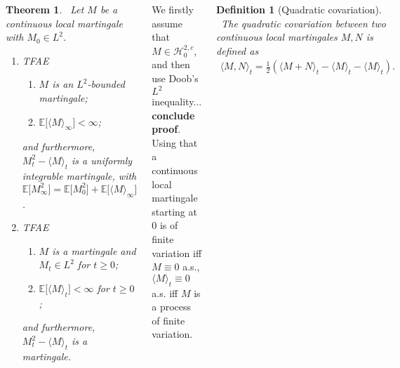 \documentclass{tikzposter} %
\newtheorem{theorem}{Theorem}
\newtheorem{definition}{Definition}
\begin{document}
\begin{columns}
{    \begin{theorem}
    \ Let $M$ be a continuous local martingale with $M_{0} \in L^{2}$.
    \begin{enumerate}[label=\roman*.]
            \item TFAE
            \begin{enumerate}[label=(\alph*)]
                    \item $M$ is an $L^{2}$-bounded martingale;
                    \item $\mathbb{E}\big[\langle M \rangle_{\infty}\big] < \infty$;
            \end{enumerate}
            and furthermore, $M_{t}^{2} - \langle M \rangle_{t}$ is a uniformly integrable martingale, with $\mathbb{E}\big[M_{\infty}^{2}\big] = \mathbb{E}\big[M_{0}^{2}\big] + \mathbb{E}\big[\langle M \rangle_{\infty}\big]$.
            \item TFAE
            \begin{enumerate}
                    \item $M$ is a martingale and $M_{t} \in L^{2}$ for $t \ge 0$;
                    \item $\mathbb{E}\big[\langle M \rangle_{t}\big] < \infty$ for $t \ge 0$;
            \end{enumerate}
            and furthermore, $M_{t}^{2} - \langle M \rangle_{t}$ is a martingale.
    \end{enumerate}
    \end{theorem}
    \hphantom{}

    We firstly assume that $M \in \mathcal{H}^{2,c}_{0}$, and then use Doob's $L^{2}$ inequality... \textbf{conclude proof}. \\

    Using that a continuous local martingale starting at $0$ is of finite variation iff $M \equiv 0$ a.s., $\langle M \rangle_{t} \equiv 0$ a.s. iff $M$ is a process of finite variation. \\

    \begin{definition}[Quadratic covariation]
    \ The quadratic covariation between two continuous local martingales $M, N$ is defined as
    \begin{align*}
      \langle M, N \rangle_{t} = \frac{1}{2}(\langle M + N \rangle_{t} - \langle M \rangle_{t} - \langle M \rangle_{t}).
    \end{align*}
    \end{definition}
    \hphantom{}

}
\end{columns}
\end{document}
